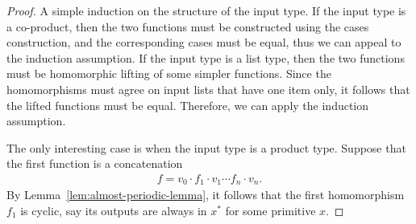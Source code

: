 \begin{proof}
    A simple induction on the structure of the input type. If the input type is a co-product, then the two functions must be constructed using the cases construction, and the corresponding cases must be equal, thus we can appeal to the induction assumption. If the input type is a list type, then the two functions must be homomorphic lifting of some simpler functions. Since the homomorphisms must agree on input lists that have one item only, it follows that the lifted functions must be equal. Therefore, we can apply the induction assumption.

    The only interesting case is when the input type is a product type. Suppose that the first function is a concatenation 
    \begin{align*}
    f = v_0 \cdot f_1 \cdot v_1 \cdots f_n \cdot v_n.
    \end{align*}
    By Lemma~\ref{lem:almost-periodic-lemma}, it follows that the first homomorphism $f_1$ is cyclic, say its outputs are always in $x^*$ for some primitive $x$.
    

\end{proof}
